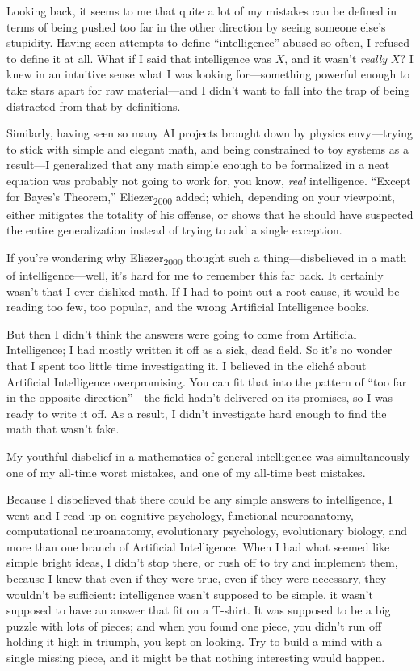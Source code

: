 {
 Looking back, it seems to me that quite a lot of my mistakes can
be defined in terms of being pushed too far in the other direction by
seeing someone else's stupidity. Having seen attempts
to define ``intelligence'' abused so
often, I refused to define it at all. What if I said that intelligence
was $X$, and it wasn't \textit{really} $X$? I knew in an
intuitive sense what I was looking for---something powerful enough to
take stars apart for raw material---and I didn't want
to fall into the trap of being distracted from that by definitions.}

{
 Similarly, having seen so many AI projects brought down by physics
envy---trying to stick with simple and elegant math, and being
constrained to toy systems as a result---I generalized that any math
simple enough to be formalized in a neat equation was probably not
going to work for, you know, \textit{real} intelligence.
``Except for Bayes's
Theorem,'' Eliezer\textsubscript{2000} added; which,
depending on your viewpoint, either mitigates the totality of his
offense, or shows that he should have suspected the entire
generalization instead of trying to add a single exception.}

{
 If you're wondering why
Eliezer\textsubscript{2000} thought such a thing---disbelieved in a
math of intelligence---well, it's hard for me to
remember this far back. It certainly wasn't that I ever
disliked math. If I had to point out a root cause, it would be reading
too few, too popular, and the wrong Artificial Intelligence books.}

{
 But then I didn't think the answers were going to
come from Artificial Intelligence; I had mostly written it off as a
sick, dead field. So it's no wonder that I spent too
little time investigating it. I believed in the cliché about Artificial
Intelligence overpromising. You can fit that into the pattern of
``too far in the opposite
direction''---the field hadn't
delivered on its promises, so I was ready to write it off. As a result,
I didn't investigate hard enough to find the math that
wasn't fake.}

{
 My youthful disbelief in a mathematics of general intelligence was
simultaneously one of my all-time worst mistakes, and one of my
all-time best mistakes.}

{
 Because I disbelieved that there could be any simple answers to
intelligence, I went and I read up on cognitive psychology, functional
neuroanatomy, computational neuroanatomy, evolutionary psychology,
evolutionary biology, and more than one branch of Artificial
Intelligence. When I had what seemed like simple bright ideas, I
didn't stop there, or rush off to try and implement
them, because I knew that even if they were true, even if they were
necessary, they wouldn't be sufficient: intelligence
wasn't supposed to be simple, it wasn't
supposed to have an answer that fit on a T-shirt. It was supposed to be
a big puzzle with lots of pieces; and when you found one piece, you
didn't run off holding it high in triumph, you kept on
looking. Try to build a mind with a single missing piece, and it might
be that nothing interesting would happen.}

